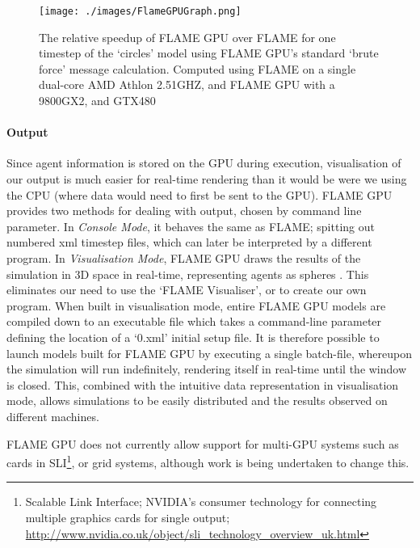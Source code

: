 \documentclass[11pt,a4paper]{article}
\begin{document}
\begin{figure}[H]
  \centering
  \texttt{[image: ./images/FlameGPUGraph.png]}
  \caption[Relative speedup of FLAME GPU over FLAME]{The relative speedup of FLAME GPU over FLAME for one timestep of the `circles' model using FLAME GPU's standard `brute force' message calculation. Computed using FLAME on a single dual-core AMD Athlon 2.51GHZ, and FLAME GPU with a 9800GX2, and GTX480 \cite{emeraldGPU}}
  \label{flamePerformanceGraph}
\end{figure}

\paragraph{Output}
\label{flameGPUOutput}
Since agent information is stored on the GPU during execution, visualisation of our output is much easier for real-time rendering than it would be were we using the CPU (where data would need to first be sent to the GPU). FLAME GPU provides two methods for dealing with output, chosen by command line parameter. In \emph{Console Mode}, it behaves the same as FLAME; spitting out numbered xml timestep files, which can later be interpreted by a different program. In \emph{Visualisation Mode}, FLAME GPU draws the results of the simulation in 3D space in real-time, representing agents as spheres \cite{fgpuTechnical}. This eliminates our need to use the `FLAME Visualiser', or to create our own program. When built in visualisation mode, entire FLAME GPU models are compiled down to an executable file which takes a command-line parameter defining the location of a `0.xml' initial setup file. It is therefore possible to launch models built for FLAME GPU by executing a single batch-file, whereupon the simulation will run indefinitely, rendering itself in real-time until the window is closed. This, combined with the intuitive data representation in visualisation mode, allows simulations to be easily distributed and the results observed on different machines.

FLAME GPU does not currently allow support for multi-GPU systems such as cards in SLI\footnote{Scalable Link Interface; NVIDIA's consumer technology for connecting multiple graphics cards for single output; \url{http://www.nvidia.co.uk/object/sli_technology_overview_uk.html}}, or grid systems, although work is being undertaken to change this.
\end{document}
